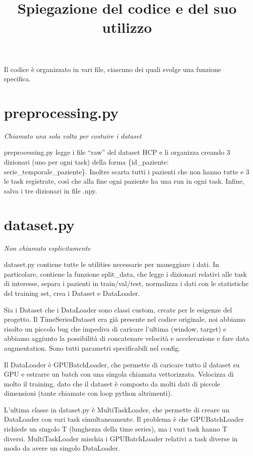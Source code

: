 \documentclass[11pt]{article}
\title{Spiegazione del codice e del suo utilizzo}
\author{}
\date{}
\newcommand{\nota}[1]{{\itshape\color{gray!60!black} #1}\par}
\begin{document}
\maketitle

Il codice è organizzato in vari file, ciascuno dei quali svolge una funzione specifica.

\section{preprocessing.py}

\nota{Chiamato una sola volta per costuire i dataset}

preprocessing.py legge i file ``raw'' del dataset HCP e li organizza creando 3 dizionari (uno per ogni task) della forma \{id\_paziente: serie\_temporale\_paziente\}. Inoltre scarta tutti i pazienti che non hanno tutte e 3 le task registrate, così che alla fine ogni paziente ha una run in ogni task. Infine, salva i tre dizionari in file .npy.

\section{dataset.py}

\nota{Non chiamato esplicitamente}

dataset.py contiene tutte le utilities necessarie per maneggiare i dati. In particolare, contiene la funzione split\_data, che legge i dizionari relativi alle task di interesse, separa i pazienti in train/val/test, normalizza i dati con le statistiche del training set, crea i Dataset e DataLoader.

Sia i Dataset che i DataLoader sono classi custom, create per le esigenze del progetto. Il TimeSeriesDataset era già presente nel codice originale, noi abbiamo risolto un piccolo bug che impediva di caricare l'ultima (window, target) e abbiamo aggiunto la possibilità di concatenare velocità e accelerazione e fare data augmentation. Sono tutti parametri specificabili nel config.

Il DataLoader è GPUBatchLoader, che permette di caricare tutto il dataset su GPU e estrarre un batch con una singola chiamata vettorizzata. Velocizza di molto il training, dato che il dataset è composto da molti dati di piccole dimensioni (tante chiamate con loop python altrimenti).

L'ultima classe in dataset.py è MultiTaskLoader, che permette di creare un DataLoader con vari task simultaneamente. Il problema è che GPUBatchLoader richiede un singolo T (lunghezza della time series), ma i vari task hanno T diversi. MultiTaskLoader mischia i GPUBatchLoader relativi a task diverse in modo da avere un singolo DataLoader.
\end{document}
